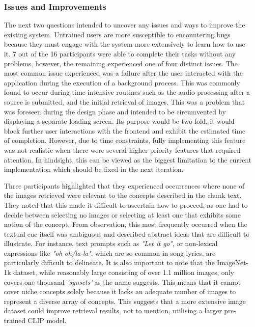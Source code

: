 \documentclass{l4proj}
\begin{document}
\subsubsection{Issues and Improvements}
The next two questions intended to uncover any issues and ways to improve the existing system. Untrained users are more susceptible to encountering bugs because they must engage with the system more extensively to learn how to use it. 7 out of the 16 participants were able to complete their tasks without any problems, however, the remaining experienced one of four distinct issues. The most common issue experienced was a failure after the user interacted with the application during the execution of a background process. This was commonly found to occur during time-intensive routines such as the audio processing after a source is submitted, and the initial retrieval of images. This was a problem that was foreseen during the design phase and intended to be circumvented by displaying a separate loading screen. Its purpose would be two-fold, it would block further user interactions with the frontend and exhibit the estimated time of completion. However, due to time constraints, fully implementing this feature was not realistic when there were several higher priority features that required attention. In hindsight, this can be viewed as the biggest limitation to the current implementation which should be fixed in the next iteration.

Three participants highlighted that they experienced occurrences where none of the images retrieved were relevant to the concepts described in the chunk text. They noted that this made it difficult to ascertain how to proceed, as one had to decide between selecting no images or selecting at least one that exhibits some notion of the concept. From observation, this most frequently occurred when the textual cue itself was ambiguous and described abstract ideas that are difficult to illustrate. For instance, text prompts such as \emph{"Let it go"}, or non-lexical expressions like \emph{"oh oh/la-la"}, which are so common in song lyrics, are particularly difficult to delineate. It is also important to note that the ImageNet-1k dataset, while reasonably large consisting of over 1.1 million images, only covers one thousand \emph{'synsets'} as the name suggests. This means that it cannot cover niche concepts solely because it lacks an adequate number of images to represent a diverse array of concepts. This suggests that a more extensive image dataset could improve retrieval results, not to mention, utilising a larger pre-trained CLIP model.
\end{document}
